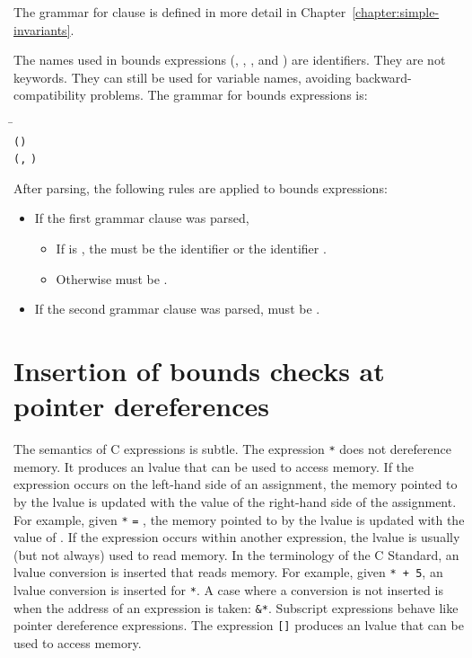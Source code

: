 The grammar for  clause  is defined in more detail in
Chapter~\ref{chapter:simple-invariants}.

The names used in bounds expressions (,
, , and ) are identifiers.
They are not keywords.  They can still be used for variable names,
avoiding backward-compatibility problems.    The grammar for
bounds expressions is:
\begin{tabbing}
\= \\
\> \lstinline|(|\lstinline|)| \\
\> \lstinline|(|\lstinline|,|
     \lstinline|)|
\end{tabbing}

After parsing, the following rules are applied to bounds
expressions:
\begin{itemize}
\item If the first grammar clause was parsed,
\begin{itemize}
\item If  is , the 
must be the identifier  or the identifier .
\item Otherwise  must be .
\end{itemize}
\item If the second grammar clause was parsed,  must be
.
\end{itemize}

\section{Insertion of bounds checks at pointer dereferences}

\label{section:bounds-checking-indirections}
The semantics of C expressions is subtle.  The expression
\lstinline|*| does not dereference memory.  It
produces an lvalue that can be used to access memory. If the expression
occurs on the left-hand side of an assignment, the memory pointed to
by the lvalue is updated with the value of the right-hand side of
the assignment.
For example, given \lstinline|*| \lstinline|=| ,
the memory pointed to by the lvalue is updated with the value of .
If the expression occurs within another expression, the lvalue is usually
(but not always)  used to read memory.  In the terminology of the C Standard,
an lvalue conversion is inserted that reads memory. For example, given
\lstinline|*|\lstinline| + 5|,
an lvalue conversion is inserted for \lstinline|*|.  A case where a
conversion is not inserted is  when the address of an expression is taken:
\lstinline|&*|. Subscript expressions behave like pointer
dereference expressions.  The expression \lstinline|[|\lstinline|]| produces
an lvalue that can be used to access memory.


